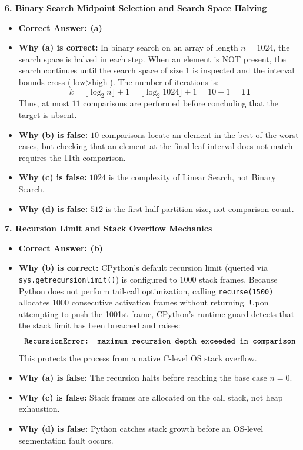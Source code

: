 \textbf{6. Binary Search Midpoint Selection and Search Space Halving}
\begin{itemize}
    \item \textbf{Correct Answer: (a)}
    \item \textbf{Why (a) is correct:}
    In binary search on an array of length $n = 1024$, the search space is halved in each step.
    When an element is NOT present, the search continues until the search space of size $1$ is inspected and the interval bounds cross ($\text{low} > \text{high}$).
    The number of iterations is:
    \begin{equation*}
    k = \lfloor \log_2 n \rfloor + 1 = \lfloor \log_2 1024 \rfloor + 1 = 10 + 1 = \mathbf{11}
    \end{equation*}
    Thus, at most $11$ comparisons are performed before concluding that the target is absent.
    \item \textbf{Why (b) is false:} $10$ comparisons locate an element in the best of the worst cases, but checking that an element at the final leaf interval does not match requires the 11th comparison.
    \item \textbf{Why (c) is false:} $1024$ is the complexity of Linear Search, not Binary Search.
    \item \textbf{Why (d) is false:} $512$ is the first half partition size, not comparison count.
\end{itemize}

\textbf{7. Recursion Limit and Stack Overflow Mechanics}
\begin{itemize}
    \item \textbf{Correct Answer: (b)}
    \item \textbf{Why (b) is correct:}
    CPython's default recursion limit (queried via \texttt{sys.getrecursionlimit()}) is configured to $1000$ stack frames.
    Because Python does not perform tail-call optimization, calling \texttt{recurse(1500)} allocates 1000 consecutive activation frames without returning.
    Upon attempting to push the 1001st frame, CPython's runtime guard detects that the stack limit has been breached and raises:
    \begin{equation*}
    \text{\texttt{RecursionError: maximum recursion depth exceeded in comparison}}
    \end{equation*}
    This protects the process from a native C-level OS stack overflow.
    \item \textbf{Why (a) is false:} The recursion halts before reaching the base case $n = 0$.
    \item \textbf{Why (c) is false:} Stack frames are allocated on the call stack, not heap exhaustion.
    \item \textbf{Why (d) is false:} Python catches stack growth before an OS-level segmentation fault occurs.
\end{itemize}

